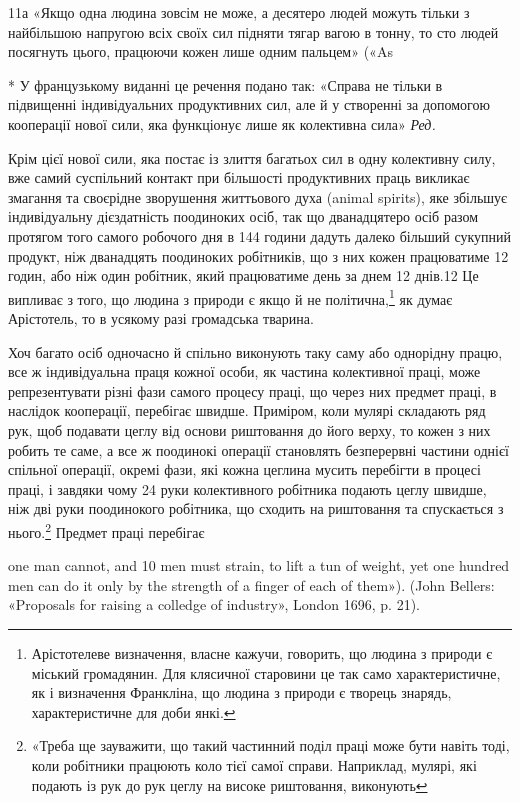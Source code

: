 11а «Якщо одна людина зовсім не може, а десятеро людей можуть
тільки з найбільшою напругою всіх своїх сил підняти тягар вагою в тонну,
то сто людей посягнуть цього, працюючи кожен лише одним пальцем» («As

* У французькому виданні це речення подано так: «Справа не тільки
в підвищенні індивідуальних продуктивних сил, але й у створенні за допомогою
кооперації нової сили, яка функціонує лише як колективна
сила» \emph{Ред.}

Крім цієї нової сили, яка постає із злиття багатьох сил в одну
колективну силу, вже самий суспільний контакт при більшості
продуктивних праць викликає змагання та своєрідне зворушення
життьового духа (animal spirits), яке збільшує індивідуальну
дієздатність поодиноких осіб, так що дванадцятеро осіб
разом протягом того самого робочого дня в 144 години дадуть
далеко більший сукупний продукт, ніж дванадцять поодиноких
робітників, що з них кожен працюватиме 12 годин, або ніж один
робітник, який працюватиме день за днем 12 днів.12 Це випливає
з того, що людина з природи є якщо й не політична,\footnote{
Арістотелеве визначення, власне кажучи, говорить, що людина з природи є міський громадянин.
Для клясичної старовини це так само
характеристичне, як і визначення Франкліна, що людина з природи є
творець знарядь, характеристичне для доби янкі.
} як думає
Арістотель, то в усякому разі громадська тварина.

Хоч багато осіб одночасно й спільно виконують таку саму або
однорідну працю, все ж індивідуальна праця кожної особи, як
частина колективної праці, може репрезентувати різні фази
самого процесу праці, що через них предмет праці, в наслідок
кооперації, перебігає швидше. Приміром, коли мулярі складають
ряд рук, щоб подавати цеглу від основи риштовання до його
верху, то кожен з них робить те саме, а все ж поодинокі операції
становлять безперервні частини однієї спільної операції, окремі
фази, які кожна цеглина мусить перебігти в процесі праці, і
завдяки чому 24 руки колективного робітника подають цеглу
швидше, ніж дві руки поодинокого робітника, що сходить на
риштовання та спускається з нього.\footnote{
«Треба ще зауважити, що такий частинний поділ праці може бути
навіть тоді, коли робітники працюють коло тієї самої справи. Наприклад,
мулярі, які подають із рук до рук цеглу на високе риштовання, виконують
} Предмет праці перебігає

one man cannot, and 10 men must strain, to lift a tun of weight, yet
one hundred men can do it only by the strength of a finger of each of them»).
(John Bellers: «Proposals for raising a colledge of industry», London
1696, p. 21).

